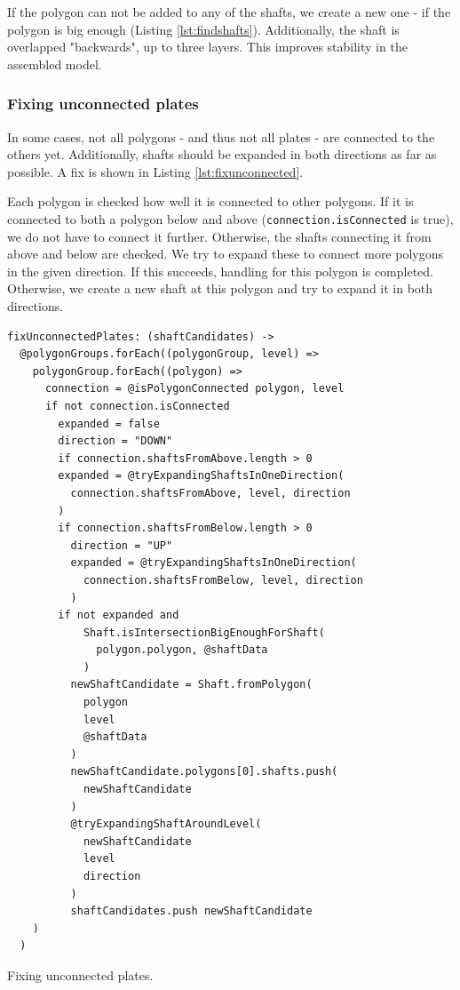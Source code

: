 \documentclass[../ClassicThesis.tex]{subfiles}
\begin{document}
If the polygon can not be added to any of the shafts, we create a new one - if the polygon is big enough (Listing \ref{lst:findshafts}). Additionally, the shaft is overlapped "backwards", up to three layers. This improves stability in the assembled model.

\subsubsection{Fixing unconnected plates}

In some cases, not all polygons - and thus not all plates - are connected to the others yet. Additionally, shafts should be expanded in both directions as far as possible. A fix is shown in Listing \ref{lst:fixunconnected}.

Each polygon is checked how well it is connected to other polygons. If it is connected to both a polygon below and above (\texttt{connection.isConnected} is true), we do not have to connect it further. Otherwise, the shafts connecting it from above and below are checked. We try to expand these to connect more polygons in the given direction. If this succeeds, handling for this polygon is completed. Otherwise, we create a new shaft at this polygon and try to expand it in both directions.

\begin{listing}
\begin{verbatim}
fixUnconnectedPlates: (shaftCandidates) ->
  @polygonGroups.forEach((polygonGroup, level) =>
    polygonGroup.forEach((polygon) =>
      connection = @isPolygonConnected polygon, level
      if not connection.isConnected
        expanded = false
        direction = "DOWN"
        if connection.shaftsFromAbove.length > 0
        expanded = @tryExpandingShaftsInOneDirection(
          connection.shaftsFromAbove, level, direction
        )
        if connection.shaftsFromBelow.length > 0
          direction = "UP"
          expanded = @tryExpandingShaftsInOneDirection(
            connection.shaftsFromBelow, level, direction
          )
        if not expanded and 
            Shaft.isIntersectionBigEnoughForShaft(
              polygon.polygon, @shaftData
            )
          newShaftCandidate = Shaft.fromPolygon(
            polygon
            level
            @shaftData
          )
          newShaftCandidate.polygons[0].shafts.push(
            newShaftCandidate
          )
          @tryExpandingShaftAroundLevel(
            newShaftCandidate
            level
            direction
          )
          shaftCandidates.push newShaftCandidate
    )
  )
\end{verbatim}
\caption{Fixing unconnected plates.}
\label{lst:fixunconnected}
\end{listing}
\end{document}

